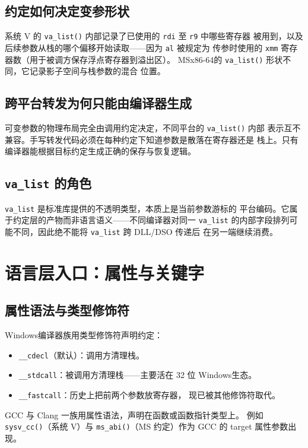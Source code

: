 \documentclass[12pt,a4paper,fontset=fandol]{ctexbook}
\newcommand{\Fn}[1]{\texttt{#1()}}
\newcommand{\Tp}[1]{\texttt{#1}}
\newcommand{\Lang}[1]{\textsf{#1}}
\newcommand{\Win}{\textsf{Windows}}
\newcommand{\xSixtyFour}{\textsf{x86-64}}
\begin{document}
\subsection{约定如何决定变参形状}\label{sec:cl10-vararg-shape}

系统 V 的 \Fn{va\_list} 内部记录了已使用的 \Tp{rdi} 至 \Tp{r9} 中哪些寄存器
被用到，以及后续参数从栈的哪个偏移开始读取——因为 \Tp{al} 被规定为
传参时使用的 \Tp{xmm} 寄存器数（用于被调方保存浮点寄存器到溢出区）。
MS\xSixtyFour 的 \Fn{va\_list} 形状不同，它记录影子空间与栈参数的混合
位置。

\subsection{跨平台转发为何只能由编译器生成}\label{sec:cl10-forward}

可变参数的物理布局完全由调用约定决定，不同平台的 \Fn{va\_list} 内部
表示互不兼容。手写转发代码必须在每种约定下知道参数是散落在寄存器还是
栈上。只有编译器能根据目标约定生成正确的保存与恢复逻辑。

\subsection{\Tp{va\_list} 的角色}\label{sec:cl10-va-list-role}

\Tp{va\_list} 是标准库提供的不透明类型，本质上是当前参数游标的
平台编码。它属于约定层的产物而非语言语义——不同编译器对同一 \Tp{va\_list}
的内部字段排列可能不同，因此绝不能将 \Tp{va\_list} 跨 DLL/DSO 传递后
在另一端继续消费。

\section{语言层入口：属性与关键字}\label{sec:cl10-lang-entry}

\subsection{属性语法与类型修饰符}\label{sec:cl10-attr-vs-modifier}

\Win 编译器族用类型修饰符声明约定：
\begin{itemize}
\item \Tp{\_\_cdecl}（默认）：调用方清理栈。
\item \Tp{\_\_stdcall}：被调用方清理栈——主要活在 32 位 \Win 生态。
\item \Tp{\_\_fastcall}：历史上把前两个参数放寄存器，
      现已被其他修饰符取代。
\end{itemize}
\Lang{GCC} 与 \Lang{Clang} 一族用属性语法，声明在函数或函数指针类型上。
例如 \Fn{sysv\_cc}（系统 V）与 \Fn{ms\_abi}（MS 约定）作为
\Lang{GCC} 的 target 属性参数出现。
\end{document}
